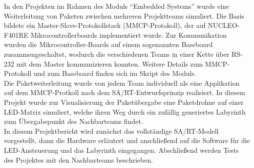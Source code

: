 In den Projekten im Rahmen des Moduls \enquote{Embedded Systems} wurde eine Weiterleitung von Paketen zwischen mehreren Projektteams simuliert. Die Basis bildete ein Master-Slave-Protokollstack (MMCP-Protokoll), der auf NUCLEO-F401RE Mikrocontrollerboards implementiert wurde. Zur Kommunikation wurden die Mikrocontroller-Boards auf einem sogenannten Baseboard zusammengeschaltet, wodurch die verschiedenen Teams in einer Kette über RS-232 mit dem Master kommunizieren konnten. Weitere Details zum MMCP-Protokoll und zum Baseboard finden sich im Skript des Moduls. \\
Die Paketweiterleitung wurde von jedem Team individuell als eine Applikation auf dem MMCP-Protkoll nach dem SA/RT-Entwurfsprinzip realisiert. In diesem Projekt wurde zur Visualisierung der Paketübergabe eine Paketdrohne auf einer LED-Matrix simuliert, welche ihren Weg durch ein zufällig generiertes Labyrinth zum Übergabepunkt des Nachbarteams findet. \\
In diesem Projektbericht wird zunächst das vollständige SA/RT-Modell vorgestellt, dann die Hardware erläutert und anschließend auf die Software für die LED-Ansteuerung und das Labyrinth eingegangen. Abschließend werden Tests des Projektes mit den Nachbarteams beschrieben.